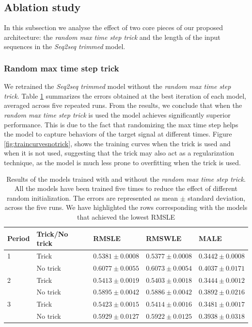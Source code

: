 \subsection{Ablation study}
In this subsection we analyse the effect of two core pieces of our proposed architecture: the \textit{random max time step trick} and the length of the  input sequences in the \textit{Seq2seq trimmed} model.

\subsubsection{Random max time step trick}
We retrained the \textit{Seq2seq trimmed} model without the \textit{random max time step trick}. Table \ref{tab:results_notrick} summarizes the errors obtained at the best iteration of each model, averaged across five repeated runs. From the results, we conclude that when the \textit{random max time step trick} is used the model achieves significantly superior performance. This is due to the fact that randomizing the max time step helps the model to capture behaviors of the target signal at different times. Figure \ref{fig:traincurvesnotrick}, shows the training curves when the trick is used and when it is not used, suggesting that the trick may also act as a regularization technique, as the model is much less prone to overfitting when the trick is used. 

	\begin{table}[!h]
	\footnotesize
	\caption{Results of the models trained with and without the \textit{random max time step trick}. All the models have been trained five times to reduce the effect of different random initialization. The errors are represented as mean $\pm$ standard deviation, across the five runs. We have highlighted the rows corresponding with the models that achieved the lowest RMSLE}
	\label{tab:results_notrick}
	\centering
	\begin{tabular}{lllll}
		\hline
		Period & Trick/No trick             & RMSLE                 & RMSWLE                & MALE                  \\ \hline
		1 & Trick   & $ \mathbf{0.5381 \pm 0.0008} $ & $ \mathbf{0.5377 \pm 0.0008} $ & $ \mathbf{0.3442 \pm 0.0008} $ \\
		& No trick & $ 0.6077 \pm 0.0055 $  &  $ 0.6073 \pm 0.0054 $  &  $ 0.4037 \pm 0.0171 $ \\
		\hline
		2 & Trick  & $ \mathbf{0.5413 \pm 0.0019} $ & $ \mathbf{0.5403 \pm 0.0018} $ & $ \mathbf{0.3444 \pm 0.0012} $ \\
		& No trick & $ 0.5895 \pm 0.0042 $  &  $ 0.5886 \pm 0.0042 $  &  $ 0.3892 \pm 0.0216 $ \\
		\hline
		3 & Trick  & $ \mathbf{0.5423 \pm 0.0015} $ & $ \mathbf{0.5414 \pm 0.0016} $ & $ \mathbf{0.3481 \pm 0.0017} $ \\
		& No trick & $ 0.5929 \pm 0.0127 $  &  $ 0.5922 \pm 0.0125 $  &  $ 0.3938 \pm 0.0318 $ \\
		\hline
	\end{tabular}
\end{table}

